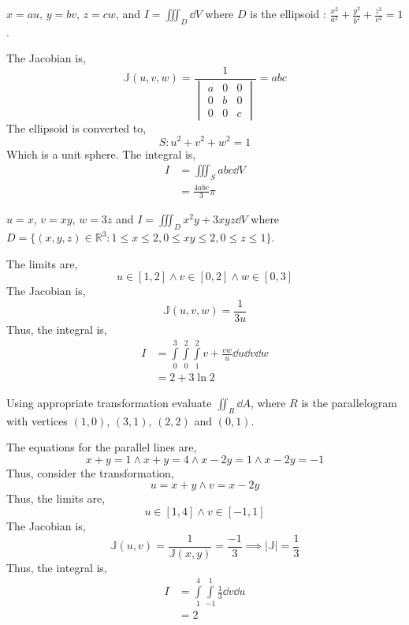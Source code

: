 \begin{asign}
	$x=au$, $y=bv$, $z=cw$, and $I=\iiint_D \dd{V}$ where $D$ is the ellipsoid : $\frac{x^2}{a^2}+\frac{y^2}{b^2}+\frac{z^2}{c^2}=1$.
\end{asign}
\begin{anse}
	The Jacobian is,
	\[\mathbb{J}(u,v,w)=\frac{1}{\begin{vmatrix}
			a & 0 & 0\\
			0 & b & 0\\
			0 & 0 & c
	\end{vmatrix}}=abc \]
	The ellipsoid is converted to,
	\[S: u^2+v^2+w^2=1\]
	Which is a unit sphere.
	The integral is,
	\[\begin{split}
		I&=\iiint_{S}abc\dd{V}\\
		&=\frac{4abc}{3}\pi
	\end{split}\]
\end{anse}
\begin{asign}
	$u=x$, $v=xy$, $w=3z$ and $I=\iiint_D x^2y+3xyz\dd{V}$ where $D=\{(x,y,z)\in\mathbb{R}^3 : 1\leq x \leq 2, 0\leq xy\leq 2, 0\leq z\leq 1 \}$.
\end{asign}
\begin{anse}
	The limits are,
	\[u\in[1,2]\land v\in[0,2]\land w\in[0,3]\]
	The Jacobian is,
	\[\mathbb{J}(u,v,w)=\frac{1}{3u}\]
	Thus, the integral is,
	\[\begin{split}
		I&=\int\limits_0^3\int\limits_0^2\int\limits_1^2v+\frac{vw}{u}\dd{u}\dd{v}\dd{w}\\
		&=2+3\ln 2
	\end{split}\]
\end{anse}
\begin{asign}
	Using appropriate transformation evaluate $\iint_R\dd{A}$, where $R$ is the parallelogram with vertices $(1,0)$, $(3,1)$, $(2,2)$ and $(0,1)$.
\end{asign}
\begin{anse}
	The equations for the parallel lines are,
	\[x+y=1\land x+y=4 \land x-2y=1\land x-2y=-1\]
	Thus, consider the transformation,
	\[u=x+y\land v=x-2y\]
	Thus, the limits are,
	\[u\in[1,4]\land v\in [-1,1]\]
	The Jacobian is,
	\[\mathbb{J}(u,v)=\frac{1}{\mathbb{J}(x,y)}=\frac{-1}{3}\implies |\mathbb{J}|=\frac{1}{3}\]
	Thus, the integral is,
	\[\begin{split}
		I&=\int\limits_1^4\int\limits_{-1}^1\frac{1}{3}\dd{v}\dd{u}\\
		&=2
	\end{split}\]
\end{anse}
